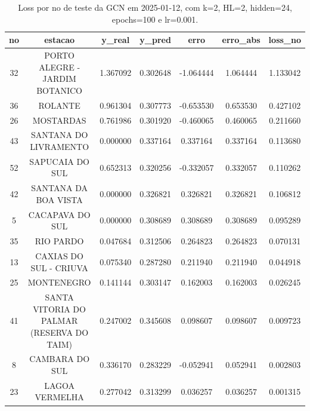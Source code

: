 \begin{table}[h]
\centering
\caption{Loss por no de teste da GCN em 2025-01-12, com k=2, HL=2, hidden=24, epochs=100 e lr=0.001.}
\label{tab:gcn_loss_k2_hl2_h24_e100_d20250112}
\begin{tabular}{ccccccc}
\toprule
no & estacao & y\_real & y\_pred & erro & erro\_abs & loss\_no \\
\midrule
32 & PORTO ALEGRE - JARDIM BOTANICO & 1.367092 & 0.302648 & -1.064444 & 1.064444 & 1.133042 \\
36 & ROLANTE & 0.961304 & 0.307773 & -0.653530 & 0.653530 & 0.427102 \\
26 & MOSTARDAS & 0.761986 & 0.301920 & -0.460065 & 0.460065 & 0.211660 \\
43 & SANTANA DO LIVRAMENTO & 0.000000 & 0.337164 & 0.337164 & 0.337164 & 0.113680 \\
52 & SAPUCAIA DO SUL & 0.652313 & 0.320256 & -0.332057 & 0.332057 & 0.110262 \\
42 & SANTANA DA BOA VISTA & 0.000000 & 0.326821 & 0.326821 & 0.326821 & 0.106812 \\
5 & CACAPAVA DO SUL & 0.000000 & 0.308689 & 0.308689 & 0.308689 & 0.095289 \\
35 & RIO PARDO & 0.047684 & 0.312506 & 0.264823 & 0.264823 & 0.070131 \\
13 & CAXIAS DO SUL - CRIUVA & 0.075340 & 0.287280 & 0.211940 & 0.211940 & 0.044918 \\
25 & MONTENEGRO & 0.141144 & 0.303147 & 0.162003 & 0.162003 & 0.026245 \\
41 & SANTA VITORIA DO PALMAR (RESERVA DO TAIM) & 0.247002 & 0.345608 & 0.098607 & 0.098607 & 0.009723 \\
8 & CAMBARA DO SUL & 0.336170 & 0.283229 & -0.052941 & 0.052941 & 0.002803 \\
23 & LAGOA VERMELHA & 0.277042 & 0.313299 & 0.036257 & 0.036257 & 0.001315 \\
\bottomrule
\end{tabular}
\end{table}
